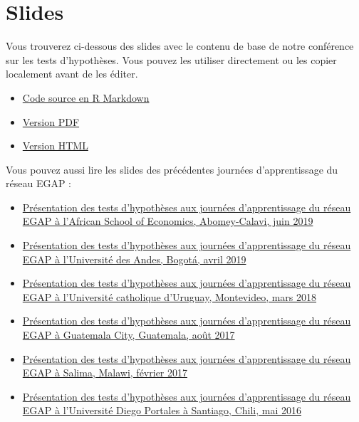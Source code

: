 \documentclass[
  12pt,
]{book}
\begin{document}
\hypertarget{slides-3}{%
\section{Slides}\label{slides-3}}

Vous trouverez ci-dessous des slides avec le contenu de base de notre conférence sur les tests d'hypothèses. Vous pouvez les utiliser directement ou les copier localement avant de les éditer.

\begin{itemize}
\item
  \href{https://egap.github.io/learningdays-resources/Slides/hypothesistesting-slides.Rmd}{Code source en R Markdown}
\item
  \href{https://egap.github.io/learningdays-resources/Slides/hypothesistesting-slides.pdf}{Version PDF}
\item
  \href{https://egap.github.io/learningdays-resources/Slides/hypothesistesting-slides.html}{Version HTML}
\end{itemize}

Vous pouvez aussi lire les slides des précédentes journées d'apprentissage du réseau EGAP :

\begin{itemize}
\item
  \href{https://egap.github.io/learningdays-resources/Slides/Examples/hypothesistesting-benin.pdf}{Présentation des tests d'hypothèses aux journées d'apprentissage du réseau EGAP à l'African School of Economics, Abomey-Calavi, juin 2019}
\item
  \href{https://egap.github.io/learningdays-resources/Slides/Examples/hypothesistesting-bogota.pdf}{Présentation des tests d'hypothèses aux journées d'apprentissage du réseau EGAP à l'Université des Andes, Bogotá, avril 2019}
\item
  \href{https://egap.github.io/learningdays-resources/Slides/Examples/hypothesistesting-montevideo.pdf}{Présentation des tests d'hypothèses aux journées d'apprentissage du réseau EGAP à l'Université catholique d'Uruguay, Montevideo, mars 2018}
\item
  \href{https://egap.github.io/learningdays-resources/Slides/Examples/hypothesistesting-guatemala.pdf}{Présentation des tests d'hypothèses aux journées d'apprentissage du réseau EGAP à Guatemala City, Guatemala, août 2017}
\item
  \href{https://egap.github.io/learningdays-resources/Slides/Examples/hypothesistesting-malawi.pdf}{Présentation des tests d'hypothèses aux journées d'apprentissage du réseau EGAP à Salima, Malawi, février 2017}
\item
  \href{https://egap.github.io/learningdays-resources/Slides/Examples/hypothesistesting-santiago.pdf}{Présentation des tests d'hypothèses aux journées d'apprentissage du réseau EGAP à l'Université Diego Portales à Santiago, Chili, mai 2016}
\end{itemize}
\end{document}
